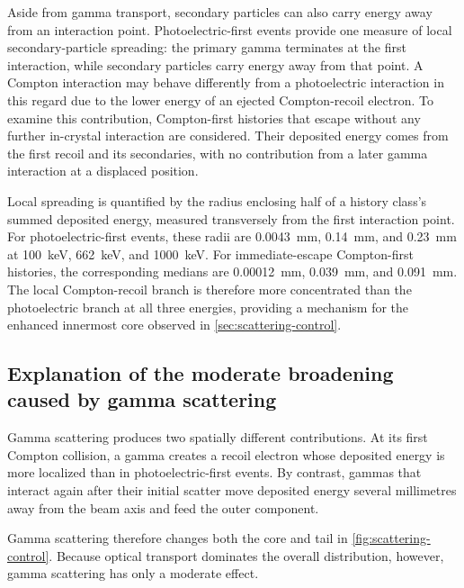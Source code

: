 Aside from gamma transport, secondary particles can also carry energy away from an interaction point. Photoelectric-first events provide one measure of local secondary-particle spreading: the primary gamma terminates at the first interaction, while secondary particles carry energy away from that point. A Compton interaction may behave differently from a photoelectric interaction in this regard due to the lower energy of an ejected Compton-recoil electron. To examine this contribution, Compton-first histories that escape without any further in-crystal interaction are considered. Their deposited energy comes from the first recoil and its secondaries, with no contribution from a later gamma interaction at a displaced position.

Local spreading is quantified by the radius enclosing half of a history class's summed deposited energy, measured transversely from the first interaction point. For photoelectric-first events, these radii are \qty{0.0043}{\milli\metre}, \qty{0.14}{\milli\metre}, and \qty{0.23}{\milli\metre} at \qty{100}{\kilo\electronvolt}, \qty{662}{\kilo\electronvolt}, and \qty{1000}{\kilo\electronvolt}. For immediate-escape Compton-first histories, the corresponding medians are \qty{0.00012}{\milli\metre}, \qty{0.039}{\milli\metre}, and \qty{0.091}{\milli\metre}. The local Compton-recoil branch is therefore more concentrated than the photoelectric branch at all three energies, providing a mechanism for the enhanced innermost core observed in \cref{sec:scattering-control}.

\subsection{Explanation of the moderate broadening caused by gamma scattering}

Gamma scattering produces two spatially different contributions. At its first Compton collision, a gamma creates a recoil electron whose deposited energy is more localized than in photoelectric-first events. By contrast, gammas that interact again after their initial scatter move deposited energy several millimetres away from the beam axis and feed the outer component.

Gamma scattering therefore changes both the core and tail in \cref{fig:scattering-control}. Because optical transport dominates the overall distribution, however, gamma scattering has only a moderate effect.
\FloatBarrier
